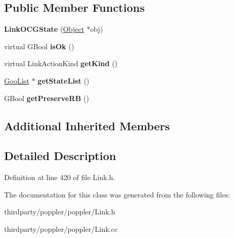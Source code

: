 \subsection*{Public Member Functions}
\begin{DoxyCompactItemize}
\item 
\mbox{\label{class_link_o_c_g_state_a2c163ce81d6550abcb5799e18a062095}} 
{\bfseries Link\+O\+C\+G\+State} (\hyperlink{class_object}{Object} $\ast$obj)
\item 
\mbox{\label{class_link_o_c_g_state_a5addbbfea5a639e351c8939123e92e6e}} 
virtual G\+Bool {\bfseries is\+Ok} ()
\item 
\mbox{\label{class_link_o_c_g_state_ab0d59c7dc3f26b6c638af9011289d78e}} 
virtual Link\+Action\+Kind {\bfseries get\+Kind} ()
\item 
\mbox{\label{class_link_o_c_g_state_a7cb9697996faccc642c99adb4daeb33d}} 
\hyperlink{class_goo_list}{Goo\+List} $\ast$ {\bfseries get\+State\+List} ()
\item 
\mbox{\label{class_link_o_c_g_state_aa5e5d1574ee44a5e85a853f1f58dc26f}} 
G\+Bool {\bfseries get\+Preserve\+RB} ()
\end{DoxyCompactItemize}
\subsection*{Additional Inherited Members}


\subsection{Detailed Description}


Definition at line 420 of file Link.\+h.



The documentation for this class was generated from the following files\+:\begin{DoxyCompactItemize}
\item 
thirdparty/poppler/poppler/Link.\+h\item 
thirdparty/poppler/poppler/Link.\+cc\end{DoxyCompactItemize}
